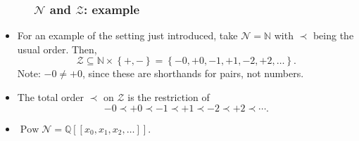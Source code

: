 \documentclass{beamer}
\newcommand{\NN}{{\mathbb N}}
\newcommand{\QQ}{{\mathbb Q}}
\newcommand{\calN}{\mathcal{N}}
\newcommand{\calZ}{\mathcal{Z}}
\newcommand{\fti}[1]{\frametitle{\ \ \ \ \ #1}}
\newcommand{\set}[1]{\left\{ #1 \right\}}
\newcommand{\ive}[1]{\left[ #1 \right]}
\theoremstyle{plain}
\begin{document}
\begin{frame}
\fti{$\calN$ and $\calZ$: example}

\begin{itemize}

\item For an example of the setting just introduced, take
$\calN = \NN$ with $\prec$ being the usual order. Then,
\[
\calZ \subseteq \NN \times \set{+, -}
= \set{ -0, +0, -1, +1, -2, +2, \ldots } .
\]
Note: $-0 \neq +0$, since these are shorthands for pairs, not
numbers.

\pause

\item The total order $\prec$ on $\calZ$ is the restriction of
\[
-0 \prec +0 \prec -1 \prec +1 \prec -2 \prec +2 \prec \cdots .
\]

\pause

\item $\operatorname*{Pow}\mathcal{N}
= \QQ\ive{\ive{x_0, x_1, x_2, \ldots}}$.

\end{itemize}

\end{frame}
\end{document}
